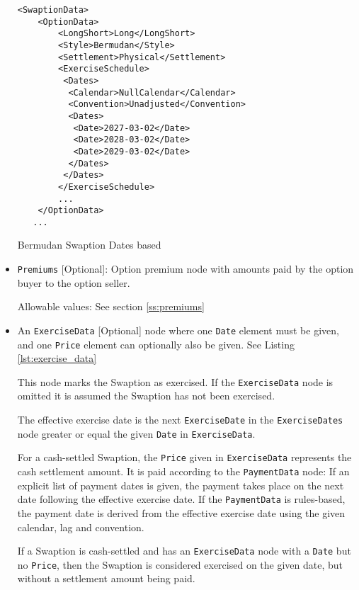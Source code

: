 \begin{itemize}
\begin{listing}[H]
\begin{verbatim}
<SwaptionData>
    <OptionData>
        <LongShort>Long</LongShort>
        <Style>Bermudan</Style>
        <Settlement>Physical</Settlement>
        <ExerciseSchedule>
         <Dates>
          <Calendar>NullCalendar</Calendar>
          <Convention>Unadjusted</Convention>
          <Dates>
           <Date>2027-03-02</Date>
           <Date>2028-03-02</Date>
           <Date>2029-03-02</Date>
          </Dates>
         </Dates>                    
        </ExerciseSchedule>
        ...
    </OptionData>
   ...
\end{verbatim}
\caption{Bermudan Swaption Dates based}
\label{lst:bermudan_swaption_dates}
\end{listing}


\item \lstinline!Premiums! [Optional]: Option premium node with amounts paid by the option buyer to the option seller.

Allowable values:  See section \ref{ss:premiums}

\item An \lstinline!ExerciseData! [Optional] node where one  \lstinline!Date! element must be given, and one \lstinline!Price! element can optionally also be given.  See Listing \ref{lst:exercise_data}

This node marks the Swaption as exercised. If the \lstinline!ExerciseData! node is omitted it is assumed the Swaption has not been exercised. 

The effective exercise date is the next \lstinline!ExerciseDate! in the \lstinline!ExerciseDates! node
  greater or equal the given \lstinline!Date!  in \lstinline!ExerciseData!. 
  
  For a cash-settled Swaption, the \lstinline!Price! given in \lstinline!ExerciseData!
  represents the cash settlement amount. It is paid according to the \lstinline!PaymentData! node: If an explicit list of payment dates is given, the payment takes place on the next date following the effective exercise date. If the \lstinline!PaymentData! is rules-based, the payment date is derived from the effective exercise date using the given calendar, lag and convention.
  
If a Swaption is cash-settled and has an \lstinline!ExerciseData! node with a \lstinline!Date!  but no \lstinline!Price!, then the Swaption is considered exercised on the given date, but without a settlement amount being paid.   
  

\end{itemize}
